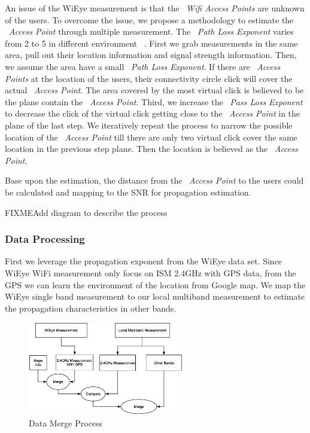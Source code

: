 An issue of the WiEye measurement is that the ~\emph{Wifi Access Points} are unknown of the users. To overcome the issue, we propose a methodology to estimate the ~\emph{Access Point} through multiple measurement.
The ~\emph{Path Loss Exponent} varies from 2 to 5 in different environment ~\cite{camp2006measurement}. 
First we grab measurements in the same area, pull out their location information and signal strength information.
Then, we assume the area have a small ~\emph{Path Loss Exponent}. If there are ~\emph{Access Points} at the location of the users, their connectivity circle click will cover the actual ~\emph{Access Point}. The area covered by the most virtual click is believed to be the plane contain the ~\emph{Access Point}.
Third, we increase the ~\emph{Pass Loss Exponent} to decrease the click of the virtual click getting close to the ~\emph{Access Point} in the plane of the last step. We iteratively repeat the process to narrow the possible location of the ~\emph{Access Point} till there are only two virtual click cover the same location in the previous step plane. 
Then the location is believed as the ~\emph{Access Point}.

Base upon the estimation, the distance from the ~\emph{Access Point} to the users could be calculated and mapping to the SNR for propagation estimation.

FIXME{Add diagram to describe the process}

\subsubsection{Data Processing}
First we leverage the propagation exponent from the WiEye data set. Since WiEye WiFi measurement only focus on ISM 2.4GHz with GPS data, from the GPS we can learn the environment of the location from Google map. We map the WiEye single band measurement to our local multiband measurement to estimate the propagation characteristics in other bands.


\begin{figure}
\centering
\includegraphics[width=68mm]{figures/wieye_process}
\vspace{-0.1in}
\caption{Data Merge Process}
\label{fig:wieye_process}
\end{figure}

